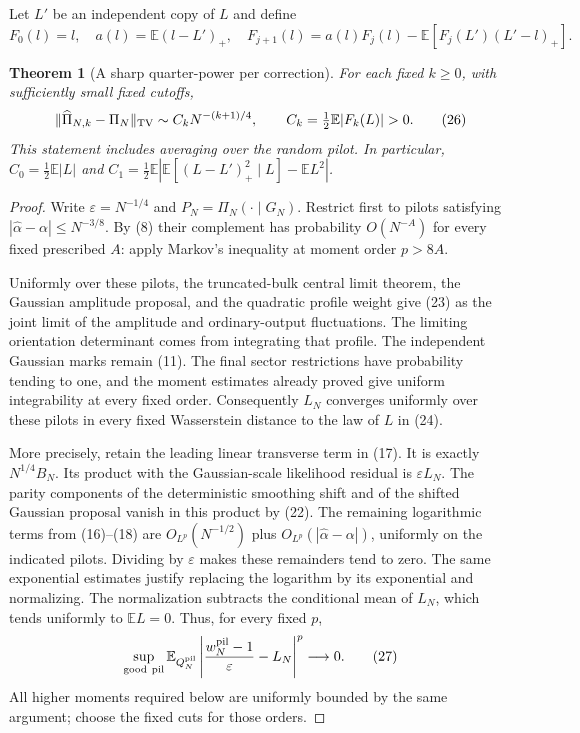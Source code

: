 \documentclass[11pt]{article}
\newtheorem{theorem}{Theorem}\newtheorem{lemma}[theorem]{Lemma}
\newcommand{\E}{\mathbb E}\newcommand{\R}{\mathbb R}
\begin{document}
Let $L'$ be an independent copy of $L$ and define
\[
 F_0(l)=l,\quad a(l)=\E(l-L')_+,\quad
 F_{j+1}(l)=a(l)F_j(l)-\E[F_j(L')(L'-l)_+].             \tag{25}
\]
\begin{theorem}[A sharp quarter-power per correction]\label{thm:sharp}
For each fixed $k\ge0$, with sufficiently small fixed cutoffs,
\[
 \|\widehat\Pi_{N,k}-\Pi_N\|_{\TV}
             \sim C_kN^{-(k+1)/4},\qquad
                   C_k=\tfrac12\E|F_k(L)|>0.           \tag{26}
\]
This statement includes averaging over the random pilot. In particular,
$C_0=\tfrac12\E|L|$ and
$C_1=\tfrac12\E|\E[(L-L')_+^2\mid L]-\E L^2|$.
\end{theorem}
\begin{proof}
Write $\varepsilon=N^{-1/4}$ and $P_N=\Pi_N(\cdot\mid G_N)$.
Restrict first to pilots satisfying
$|\widehat\alpha-\alpha|\le N^{-3/8}$. By (8) their complement has
probability $O(N^{-A})$ for every fixed prescribed $A$: apply Markov's
inequality at moment order $p>8A$.

Uniformly over these pilots, the truncated-bulk central limit theorem,
the Gaussian amplitude proposal, and the quadratic profile weight give
(23) as the joint limit of the amplitude and ordinary-output
fluctuations. The limiting orientation determinant comes from integrating
that profile. The independent Gaussian marks remain (11). The final
sector restrictions have probability tending to one, and the moment
estimates already proved give uniform integrability at every fixed
order. Consequently $L_N$ converges uniformly over these pilots in every
fixed Wasserstein distance to the law of $L$ in (24).

More precisely, retain the leading linear transverse term in (17).
It is exactly $N^{1/4}B_N$. Its product with the Gaussian-scale
likelihood residual is $\varepsilon L_N$. The parity components of
the deterministic smoothing shift and of the shifted Gaussian proposal
vanish in this product by (22). The remaining logarithmic terms from
(16)--(18) are $O_{L^p}(N^{-1/2})$ plus
$O_{L^p}(|\widehat\alpha-\alpha|)$, uniformly on the indicated pilots.
Dividing by $\varepsilon$ makes these remainders tend to zero.
The same exponential estimates justify replacing the logarithm by its
exponential and normalizing. The normalization subtracts the conditional
mean of $L_N$, which tends uniformly to $\E L=0$. Thus, for every
fixed $p$,
\[
 \sup_{\rm good\ pil}\E_{Q_N^{\rm pil}}
 \left|\frac{w_N^{\rm pil}-1}{\varepsilon}-L_N\right|^p
                         \longrightarrow0.             \tag{27}
\]
All higher moments required below are uniformly bounded by the same
argument; choose the fixed cuts for those orders.


\end{proof}
\end{document}
